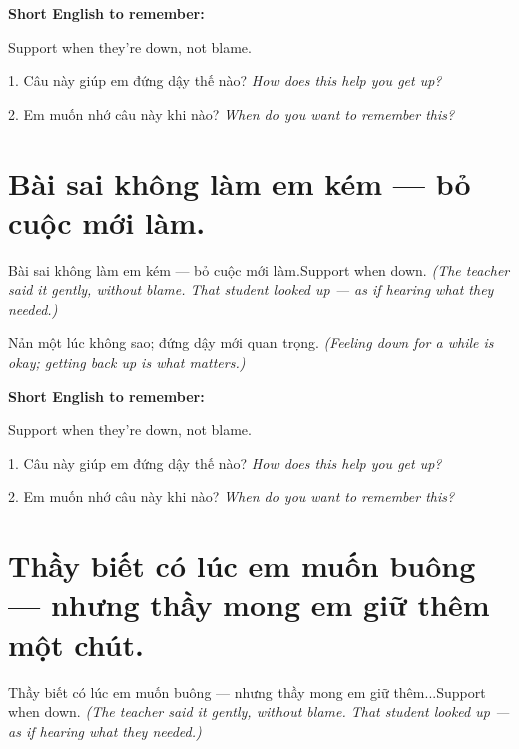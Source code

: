 \begin{ghinhoanh}
\textbf{Short English to remember:}

Support when they're down, not blame.

\end{ghinhoanh}

\begin{tuhocnhanh}
1. Câu này giúp em đứng dậy thế nào? \textit{How does this help you get up?}

2. Em muốn nhớ câu này khi nào? \textit{When do you want to remember this?}
\end{tuhocnhanh}
\ngancach


\section{Bài sai không làm em kém — bỏ cuộc mới làm.}
\begin{truyen}{Bài sai không làm em kém — bỏ cuộc mới làm.}{Support when down.}
\textit{(The teacher said it gently, without blame. That student looked up — as if hearing what they needed.)}
\end{truyen}

\begin{baihoc}
Nản một lúc không sao; đứng dậy mới quan trọng.
\textit{(Feeling down for a while is okay; getting back up is what matters.)}
\end{baihoc}

\begin{ghinhoanh}
\textbf{Short English to remember:}

Support when they're down, not blame.

\end{ghinhoanh}

\begin{tuhocnhanh}
1. Câu này giúp em đứng dậy thế nào? \textit{How does this help you get up?}

2. Em muốn nhớ câu này khi nào? \textit{When do you want to remember this?}
\end{tuhocnhanh}
\ngancach


\section{Thầy biết có lúc em muốn buông — nhưng thầy mong em giữ thêm một chút.}
\begin{truyen}{Thầy biết có lúc em muốn buông — nhưng thầy mong em giữ thêm...}{Support when down.}
\textit{(The teacher said it gently, without blame. That student looked up — as if hearing what they needed.)}
\end{truyen}

